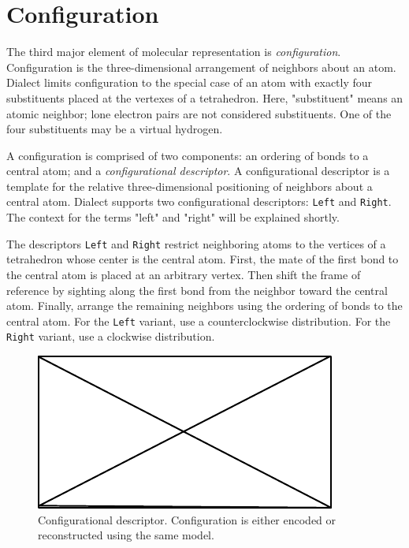 \documentclass{article}
\def\ttt{\texttt}
\begin{document}
\section*{Configuration}

The third major element of molecular representation is \textit{configuration}. Configuration is the three-dimensional arrangement of neighbors about an atom. Dialect limits configuration to the special case of an atom with exactly four substituents placed at the vertexes of a tetrahedron. Here, "substituent" means an atomic neighbor; lone electron pairs are not considered substituents. One of the four substituents may be a virtual hydrogen.

A configuration is comprised of two components: an ordering of bonds to a central atom; and a \textit{configurational descriptor}. A configurational descriptor is a template for the relative three-dimensional positioning of neighbors about a central atom. Dialect supports two configurational descriptors: \ttt{Left} and \ttt{Right}. The context for the terms "left" and "right" will be explained shortly.

The descriptors \ttt{Left} and \ttt{Right} restrict neighboring atoms to the vertices of a tetrahedron whose center is the central atom. First, the mate of the first bond to the central atom is placed at an arbitrary vertex. Then shift the frame of reference by sighting along the first bond from the neighbor toward the central atom. Finally, arrange the remaining neighbors using the ordering of bonds to the central atom. For the \ttt{Left} variant, use a counterclockwise distribution. For the \ttt{Right} variant, use a clockwise distribution.

\begin{figure}
    \centering
    \includegraphics{filler}
    \caption{Configurational descriptor. Configuration is either encoded or reconstructed using the same model.}
    \label{fig:configurational-descriptor}
\end{figure}
\end{document}
